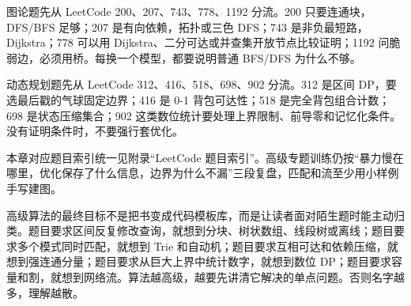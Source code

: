 图论题先从 LeetCode 200、207、743、778、1192 分流。200 只要连通块，DFS/BFS 足够；207 是有向依赖，拓扑或三色 DFS；743 是非负最短路，Dijkstra；778 可以用 Dijkstra、二分可达或并查集开放节点比较证明；1192 问脆弱边，必须用桥。每换一个模型，都要说明普通 BFS/DFS 为什么不够。

动态规划题先从 LeetCode 312、416、518、698、902 分流。312 是区间 DP，要选最后戳的气球固定边界；416 是 0-1 背包可达性；518 是完全背包组合计数；698 是状态压缩集合；902 这类数位统计要处理上界限制、前导零和记忆化条件。没有证明条件时，不要强行套优化。



\begin{exercisebox}
本章对应题目索引统一见附录“LeetCode 题目索引”。高级专题训练仍按“暴力慢在哪里，优化保存了什么信息，边界为什么不漏”三段复盘，匹配和流至少用小样例手写建图。
\end{exercisebox}

高级算法的最终目标不是把书变成代码模板库，而是让读者面对陌生题时能主动归类。题目要求区间反复修改查询，就想到分块、树状数组、线段树或离线；题目要求多个模式同时匹配，就想到 Trie 和自动机；题目要求互相可达和依赖压缩，就想到强连通分量；题目要求从巨大上界中统计数字，就想到数位 DP；题目要求容量和割，就想到网络流。算法越高级，越要先讲清它解决的单点问题。否则名字越多，理解越散。
